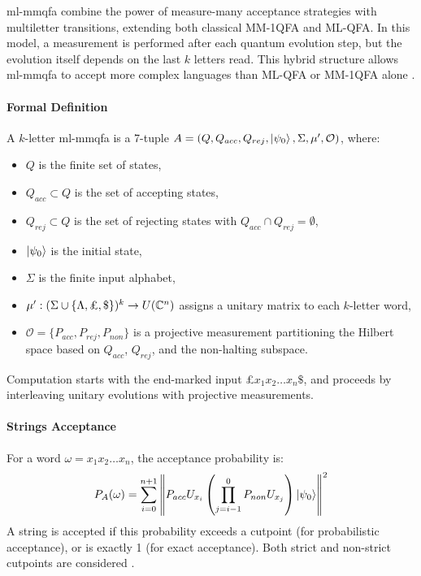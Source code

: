 \gls{ml-mmqfa} combine the power of measure-many acceptance strategies with multiletter transitions, extending both classical MM-1QFA and ML-QFA. In this model, a measurement is performed after each quantum evolution step, but the evolution itself depends on the last $k$ letters read. This hybrid structure allows \gls{ml-mmqfa} to accept more complex languages than ML-QFA or MM-1QFA alone \cite{lin2012equivalence}.

\paragraph{Formal Definition}
A $k$-letter \gls{ml-mmqfa} is a 7-tuple $A = (Q, Q_{acc}, Q_{rej}, \ket{\psi_0}, \Sigma, \mu', \mathcal{O})$, where:
\begin{itemize}
    \item $Q$ is the finite set of states,
    \item $Q_{acc} \subset Q$ is the set of accepting states,
    \item $Q_{rej} \subset Q$ is the set of rejecting states with $Q_{acc} \cap Q_{rej} = \emptyset$,
    \item $\ket{\psi_0}$ is the initial state,
    \item $\Sigma$ is the finite input alphabet,
    \item $\mu': (\Sigma \cup \{\Lambda, \text{\textsterling}, \$\})^k \to U(\mathbb{C}^n)$ assigns a unitary matrix to each $k$-letter word,
    \item $\mathcal{O} = \{P_{acc}, P_{rej}, P_{non}\}$ is a projective measurement partitioning the Hilbert space based on $Q_{acc}$, $Q_{rej}$, and the non-halting subspace.
\end{itemize}
Computation starts with the end-marked input £$x_1x_2 \dots x_n\$$, and proceeds by interleaving unitary evolutions with projective measurements.

\paragraph{Strings Acceptance}
For a word $\omega = x_1 x_2 \dots x_n$, the acceptance probability is:
\[
P_A(\omega) = \sum_{i=0}^{n+1} \left\| P_{acc} U_{x_i} \left( \prod_{j=i-1}^{0} P_{non} U_{x_j} \right) \ket{\psi_0} \right\|^2
\]
A string is accepted if this probability exceeds a cutpoint (for probabilistic acceptance), or is exactly 1 (for exact acceptance). Both strict and non-strict cutpoints are considered \cite{lin2012equivalence}.

